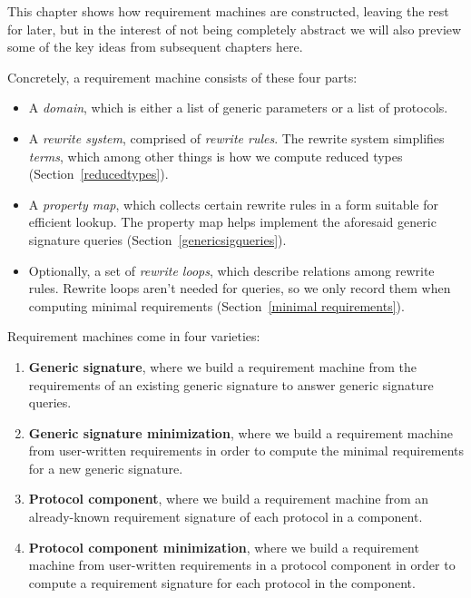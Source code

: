 \documentclass[../generics]{subfiles}
\begin{document}
This chapter shows how requirement machines are constructed, leaving the rest for later, but in the interest of not being completely abstract we will also preview some of the key ideas from subsequent chapters here.
\begin{center}
\end{center}
%
%
%
%
%
Concretely, a requirement machine consists of these four parts:
\begin{itemize}
\item A \emph{domain}, which is either a list of generic parameters or a list of protocols.
\item A \emph{rewrite system}, comprised of \emph{rewrite rules}. The rewrite system simplifies \emph{terms}, which among other things is how we compute reduced types (Section~\ref{reducedtypes}).
\item A \emph{property map}, which collects certain rewrite rules in a form suitable for efficient lookup. The property map helps implement the aforesaid generic signature queries (Section~\ref{genericsigqueries}).
\item Optionally, a set of \emph{rewrite loops}, which describe relations among rewrite rules. Rewrite loops aren't needed for queries, so we only record them when computing minimal requirements (Section~\ref{minimal requirements}).
\end{itemize}
Requirement machines come in four varieties:
\begin{enumerate}
\item \textbf{Generic signature}, where we build a requirement machine from the requirements of an existing generic signature to answer generic signature queries.
\item \textbf{Generic signature minimization}, where we build a requirement machine from user-written requirements in order to compute the minimal requirements for a new generic signature.
\item \textbf{Protocol component}, where we build a requirement machine from an already-known requirement signature of each protocol in a component.
\item \textbf{Protocol component minimization}, where we build a requirement machine from user-written requirements in a protocol component in order to compute a requirement signature for each protocol in the component.
\end{enumerate}
\end{document}
